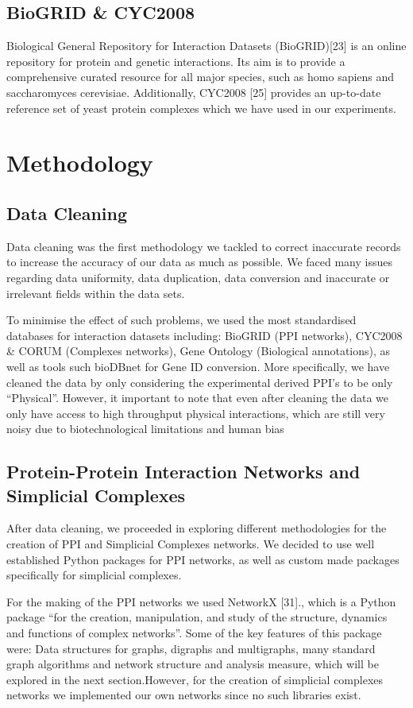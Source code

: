 \documentclass[9pt]{article}
\begin{document}
\subsection{BioGRID \& CYC2008}
Biological General Repository for Interaction Datasets (BioGRID)[23] is an online repository for protein and genetic interactions. Its aim is to provide a comprehensive curated resource for all major species, such as homo sapiens and saccharomyces cerevisiae. Additionally, CYC2008 [25] provides an up-to-date reference set of yeast protein complexes which we have used in our experiments. 

\section{Methodology}
\subsection{Data Cleaning}
Data cleaning was the first methodology we tackled to correct inaccurate records to increase the accuracy of our data as much as possible. We faced many issues regarding data uniformity, data duplication, data conversion and inaccurate or irrelevant fields within the data sets. 
\par
To minimise the effect of such problems, we used the most standardised databases for interaction datasets including: BioGRID (PPI networks), CYC2008 \& CORUM (Complexes networks), Gene Ontology (Biological annotations), as well as tools such bioDBnet for Gene ID conversion. More specifically, we have cleaned the data by only considering the experimental derived PPI’s to be only “Physical”. However, it important to note that even after cleaning the data we only have access to high throughput physical interactions, which are still very noisy due to biotechnological limitations and human bias

\subsection{Protein-Protein Interaction Networks and Simplicial Complexes}
After data cleaning, we proceeded in exploring different methodologies for the creation of PPI and Simplicial Complexes networks. We decided to use well established Python packages for PPI networks, as well as custom made packages specifically for simplicial complexes.
\par
For the making of the PPI networks we used NetworkX [31]., which is a Python package “for the creation, manipulation, and study of the structure, dynamics and functions of complex networks”. Some of the key features of this package were: Data structures for graphs, digraphs and multigraphs, many standard graph algorithms and network structure and analysis measure, which will be explored in the next section.However, for the creation of simplicial complexes networks we implemented our own networks since no such libraries exist. 
\end{document}
